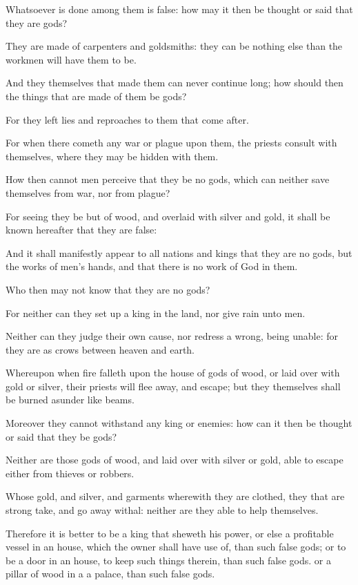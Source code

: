 {\par }{\PP {}Whatsoever is done among them is false: how may it then be thought or said that they are gods?
\par }{\PP {}They are made of carpenters and goldsmiths: they can be nothing else than the workmen will have them to be.
\par }{\PP {}And they themselves that made them can never continue long; how should then the things that are made of them be gods?
\par }{\PP {}For they left lies and reproaches to them that come after.
\par }{\PP {}For when there cometh any war or plague upon them, the priests consult with themselves, where they may be hidden with them.
\par }{\PP {}How then cannot men perceive that they be no gods, which can neither save themselves from war, nor from plague?
\par }{\PP {}For seeing they be but of wood, and overlaid with silver and gold, it shall be known hereafter that they are false:
\par }{\PP {}And it shall manifestly appear to all nations and kings that they are no gods, but the works of men’s hands, and that there is no work of God in them.
\par }{\PP {}Who then may not know that they are no gods?
\par }{\PP {}For neither can they set up a king in the land, nor give rain unto men.
\par }{\PP {}Neither can they judge their own cause, nor redress a wrong, being unable: for they are as crows between heaven and earth.
\par }{\PP {}Whereupon when fire falleth upon the house of gods of wood, or laid over with gold or silver, their priests will flee away, and escape; but they themselves shall be burned asunder like beams.
\par }{\PP {}Moreover they cannot withstand any king or enemies: how can it then be thought or said that they be gods?
\par }{\PP {}Neither are those gods of wood, and laid over with silver or gold, able to escape either from thieves or robbers.
\par }{\PP {}Whose gold, and silver, and garments wherewith they are clothed, they that are strong take, and go away withal: neither are they able to help themselves.
\par }{\PP {}Therefore it is better to be a king that sheweth his power, or else a profitable vessel in an house, which the owner shall have use of, than such false gods; or to be a door in an house, to keep such things therein, than such false gods. or a pillar of wood in a a palace, than such false gods.
}
